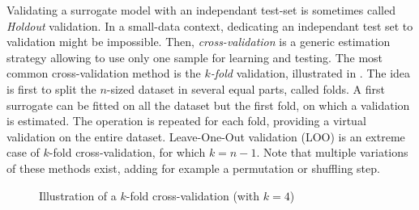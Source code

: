 Validating a surrogate model with an independant test-set is sometimes called \textit{Holdout} validation.
In a small-data context, dedicating an independant test set to validation might be impossible.
Then, \textit{cross-validation} is a generic estimation strategy allowing to use only one sample for learning and testing. 
The most common cross-validation method is the \textit{$k$-fold} validation, illustrated in . 
The idea is first to split the $n$-sized dataset in several equal parts, called folds. 
A first surrogate can be fitted on all the dataset but the first fold, on which a validation is estimated. 
The operation is repeated for each fold, providing a virtual validation on the entire dataset. 
Leave-One-Out validation (LOO) is an extreme case of $k$-fold cross-validation, for which $k=n-1$. 
Note that multiple variations of these methods exist, adding for example a permutation or shuffling step. 


\begin{figure}[ht]
    \centering
      \caption{Illustration of a $k$-fold cross-validation (with $k=4$)} 
      \label{fig:kfold}
\end{figure}



